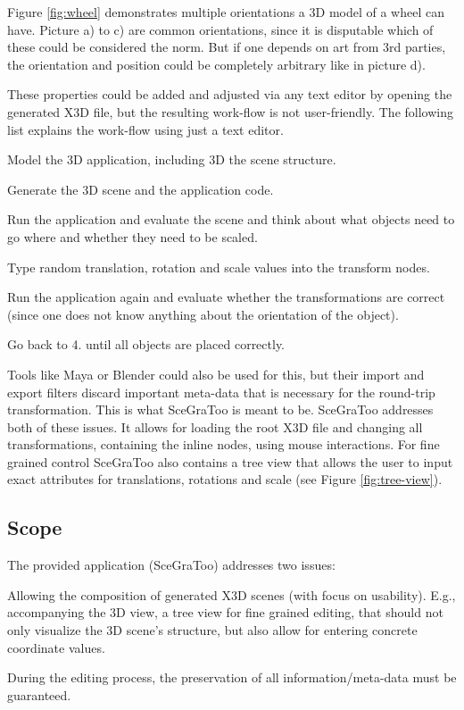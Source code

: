 Figure \ref{fig:wheel} demonstrates multiple orientations a \gls{3D} model of a wheel can have. Picture a) to c) are common
orientations, since it is disputable which of these could be considered the
norm. But if one depends on art from 3rd parties, the orientation and position
could be completely arbitrary like in picture d).

These properties could be added and adjusted via any text editor by opening the
generated \gls{X3D} file, but the resulting work-flow is not user-friendly. The
following list explains the work-flow using just a text editor.

\begin{enumerate*}
  \item Model the \gls{3D} application, including \gls{3D} the scene structure.
  \item Generate the \gls{3D} scene and the application code.
  \item Run the application and evaluate the scene and think about what objects need to go where and whether they need to be scaled.
  \item Type random translation, rotation and scale values into the transform nodes.
  \item Run the application again and evaluate whether the transformations are correct (since one does not know anything about the orientation of the object).
  \item Go back to 4. until all objects are placed correctly.
\end{enumerate*}

Tools like Maya or Blender could also be used for this, but their import
and export filters discard important meta-data that is necessary for the
round-trip transformation. This is what \gls{SceGraToo} is meant to be. \gls{SceGraToo} addresses both of these issues. It allows for loading the root \gls{X3D} file and changing all transformations, containing the inline nodes,
using mouse interactions. For fine grained control \gls{SceGraToo} also
contains a tree view that allows the user to input exact attributes for
translations, rotations and scale (see Figure \ref{fig:tree-view}).

\subsection{Scope}\label{scope}

The provided application (\gls{SceGraToo}) addresses two issues:

\begin{enumerate*}
  \item Allowing the composition of generated \gls{X3D} scenes (with focus on usability). E.g., accompanying the \gls{3D} view, a tree view for fine grained editing, that should not only visualize the \gls{3D} scene's structure, but also allow for entering concrete coordinate values.
  \item During the editing process, the preservation of all information/meta-data must be guaranteed.
\end{enumerate*}
